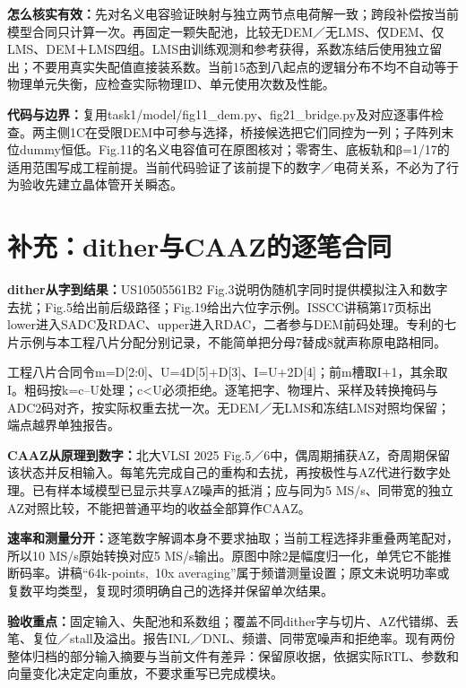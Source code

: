 \documentclass[zihao=5,a4paper,fontset=none]{ctexart}
\begin{document}
\textbf{怎么核实有效：}先对名义电容验证映射与独立两节点电荷解一致；跨段补偿按当前模型合同只计算一次。再固定一颗失配池，比较无DEM／无LMS、仅DEM、仅LMS、DEM＋LMS四组。LMS由训练观测和参考获得，系数冻结后使用独立留出；不要用真实失配值直接装系数。当前15态到八起点的逻辑分布不均不自动等于物理单元失衡，应检查实际物理ID、单元使用次数及性能。

\textbf{代码与边界：}复用task1/model/fig11\_dem.py、fig21\_bridge.py及对应逐事件检查。两主侧1C在受限DEM中可参与选择，桥接候选把它们同控为一列；子阵列末位dummy恒低。Fig.11的名义电容值可在原图核对；零寄生、底板轨和β=1/17的适用范围写成工程前提。当前代码验证了该前提下的数字／电荷关系，不必为了行为验收先建立晶体管开关瞬态。


\clearpage
\section{补充：dither与CAAZ的逐笔合同}

\textbf{dither从字到结果：}US10505561B2 Fig.3说明伪随机字同时提供模拟注入和数字去扰；Fig.5给出前后级路径；Fig.19给出六位字示例。ISSCC讲稿第17页标出lower进入SADC及RDAC、upper进入RDAC，二者参与DEM前码处理。专利的七片示例与本工程八片分配分别记录，不能简单把分母7替成8就声称原电路相同。

工程八片合同令m=D[2:0]、U=4D[5]+D[3]、I=U+2D[4]；前m槽取I+1，其余取I。粗码按k=c--U处理；c<U必须拒绝。逐笔把字、物理片、采样及转换掩码与ADC2码对齐，按实际权重去扰一次。无DEM／无LMS和冻结LMS对照均保留；端点越界单独报告。

\textbf{CAAZ从原理到数字：}北大VLSI 2025 Fig.5／6中，偶周期捕获AZ，奇周期保留该状态并反相输入。每笔先完成自己的重构和去扰，再按极性与AZ代进行数字处理。已有样本域模型已显示共享AZ噪声的抵消；应与同为5 MS/s、同带宽的独立AZ对照比较，不能把普通平均的收益全部算作CAAZ。

\textbf{速率和测量分开：}逐笔数字解调本身不要求抽取；当前工程选择非重叠两笔配对，所以10 MS/s原始转换对应5 MS/s输出。原图中除2是幅度归一化，单凭它不能推断码率。讲稿``64k-points,~10x averaging''属于频谱测量设置；原文未说明功率或复数平均类型，复现时须明确自己的选择并保留单次结果。

\textbf{验收重点：}固定输入、失配池和系数组；覆盖不同dither字与切片、AZ代错绑、丢笔、复位／stall及溢出。报告INL／DNL、频谱、同带宽噪声和拒绝率。现有两份整体归档的部分输入摘要与当前文件有差异：保留原收据，依据实际RTL、参数和向量变化决定定向重放，不要求重写已完成模块。


\end{document}

